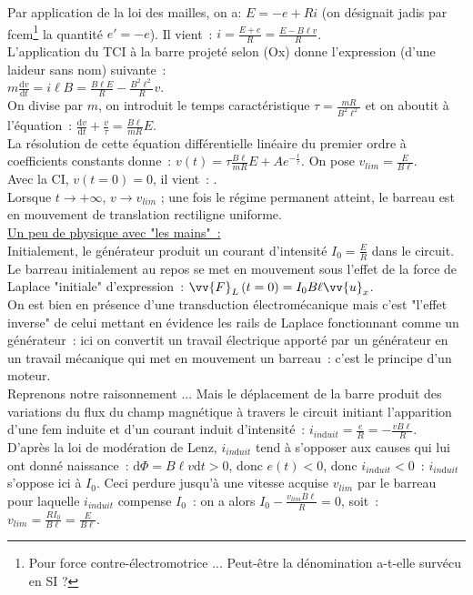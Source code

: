 \documentclass{article}
\renewcommand\overrightarrow{\vv}
\begin{document}
Par application de la loi des mailles, on a: $E = -e+Ri$ (on
désignait jadis par fcem\footnote{Pour force contre-électromotrice
... Peut-être la dénomination a-t-elle survécu en SI ?} la quantité
$e' = -e$). Il
vient : $i = \frac{E+e}{R} = \frac{E-B\ell v}{R}$. \\
L'application du TCI à la barre projeté selon (Ox) donne l'expression (d'une laideur sans nom) suivante : \\
$m\frac{\mathrm{d}v}{\mathrm{d}t} = i\ell B = \frac{B \ell E}{R} -
\frac{B^{2}\ell^{2}}{R}v$. \\
On divise par $m$, on introduit le
temps caractéristique $\tau = \frac{mR}{B^{2}\ell^{2}}$ et on
aboutit à
l'équation : $\frac{\mathrm{d}v}{\mathrm{d}t}+\frac{v}{\tau} = \frac{B\ell}{mR}E$. \\
La résolution de cette équation différentielle linéaire du premier
ordre à coefficients constants donne : $v\left(t\right) = \tau\frac{B\ell}{mR}E
+Ae^{-\frac{t}{\tau}}$. On pose $v_{lim} = \frac{E}{B\ell}$. \\
Avec la CI, $v\left(t=0\right) = 0$, il vient : . \\
Lorsque $t \rightarrow +\infty$, $v \rightarrow v_{lim}$ ; une fois
le régime permanent atteint, le barreau est en mouvement de
translation rectiligne uniforme. \\
\underline{Un peu de physique avec "les mains" :} \\
Initialement, le générateur produit un courant d'intensité $I_{0} =
\frac{E}{R}$ dans le circuit. Le barreau initialement au repos se
met en mouvement sous l'effet de la force de Laplace "initiale"
d'expression : $\overrightarrow{F}_{L} \left(t=0\right) =
I_{0}B \ell\overrightarrow{u}_{x}$. \\
On est bien en présence d'une transduction électromécanique mais
c'est "l'effet inverse" de celui mettant en évidence les rails de
Laplace fonctionnant comme un générateur : ici on convertit un
travail électrique apporté par un générateur en un travail mécanique
qui met en mouvement un barreau : c'est le principe d'un moteur.\\
Reprenons notre raisonnement ... Mais le déplacement de la barre
produit des variations du flux du champ magnétique à travers le
circuit initiant l'apparition d'une fem induite et d'un courant
induit d'intensité : $i_{in\mathrm{d}uit} =
\frac{e}{R} = -\frac{vB\ell}{R}$. \\
D'après la loi de modération de Lenz, $i_{in\mathrm{d}uit}$ tend à s'opposer
aux causes qui lui ont donné naissance : $\mathrm{d}\Phi = B\ell v \mathrm{d}t >0$,
donc $e\left(t\right) < 0$, donc $i_{in\mathrm{d}uit} < 0$ : $i_{in\mathrm{d}uit}$ s'oppose ici à
$I_{0}$. Ceci perdure jusqu'à une vitesse acquise $v_{lim}$ par le
barreau pour laquelle $i_{in\mathrm{d}uit}$ compense $I_{0}$ : on a alors
$I_{0}-\frac{v_{lim}B\ell}{R}=0$, soit : $v_{lim} = \frac{RI_{0}}{B
\ell} = \frac{E}{B \ell}$.\\
\end{document}
